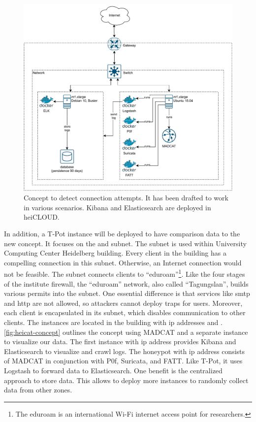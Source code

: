 \begin{figure}
    \centering
    \includegraphics[width=\textwidth]{figures/heicat-concept.pdf}
    \caption[Concept to detect connection attempts]{
        Concept to detect connection attempts.
        It has been drafted to work in various scenarios.
        Kibana and Elasticsearch are deployed in heiCLOUD.
    }
    \label{fig:heicat-concept}
\end{figure}

In addition, a T-Pot instance will be deployed to have comparison data to the new concept.
It focuses on the  and  subnet.
The  subnet is used within University Computing Center Heidelberg building.
Every client in the building has a compelling connection in this subnet.
Otherwise, an Internet connection would not be feasible.
The subnet  connects clients to \enquote{eduroam}\footnote{The eduroam is an international Wi-Fi internet access point for researchers.}.
Like the four stages of the institute firewall, the \enquote{eduroam} network, also called \enquote{Tagungslan}, builds various permits into the subnet.
One essential difference is that services like \ac{smtp} and \ac{http} are not allowed, so attackers cannot deploy traps for users.
Moreover, each client is encapsulated in its subnet, which disables communication to other clients.
The instances are located in the building with \ac{ip} addresses  and .
\autoref{fig:heicat-concept} outlines the concept using MADCAT and a separate instance to visualize our data.
The first instance with \ac{ip} address  provides Kibana and Elasticsearch to visualize and crawl logs.
The honeypot with \ac{ip} address  consists of MADCAT in conjunction with P0f, Suricata, and FATT.
Like T-Pot, it uses Logstash to forward data to Elasticsearch.
One benefit is the centralized approach to store data.
This allows to deploy more instances to randomly collect data from other zones.

